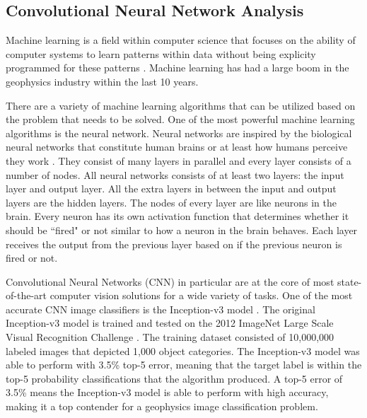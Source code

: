 \subsection{Convolutional Neural Network Analysis}
Machine learning is a field within computer science that focuses on the ability of computer systems to learn patterns within data without being explicity programmed for these patterns \citep{samuel1959some}. Machine learning has had a large boom in the geophysics industry within the last 10 years.


There are a variety of machine learning algorithms that can be utilized based on the problem that needs to be solved. One of the most powerful machine learning algorithms is the neural network. Neural networks are inspired by the biological neural networks that constitute human brains or at least how humans perceive they work \citep{Gerven2018}. They consist of many layers in parallel and every layer consists of a number of nodes. All neural networks consists of at least two layers: the input layer and output layer. All the extra layers in between the input and output layers are the hidden layers. The nodes of every layer are like neurons in the brain. Every neuron has its own activation function that determines whether it should be ``fired" or not similar to how a neuron in the brain behaves. Each layer receives the output from the previous layer based on if the previous neuron is fired or not.

Convolutional Neural Networks (CNN) in particular are at the core of most state-of-the-art computer vision solutions for a wide variety of tasks. One of the most accurate CNN image classifiers is the Inception-v3 model \citep{Szegedy2015}. The original Inception-v3 model is trained and tested on the 2012 ImageNet Large Scale Visual Recognition Challenge \citep{ILSVRC15}. The training dataset consisted of 10,000,000 labeled images that depicted 1,000 object categories. The Inception-v3 model was able to perform with 3.5\% top-5 error, meaning that the target label is within the top-5 probability classifications that the algorithm produced. A top-5 error of 3.5\% means the Inception-v3 model is able to perform with high accuracy, making it a top contender for a geophysics image classification problem.

